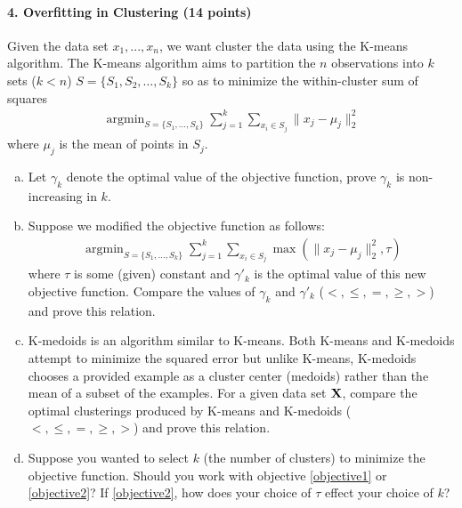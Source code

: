 \documentclass[11pt]{article}
\newcommand{\X}{{\bf X}}
\begin{document}
	\paragraph{4. Overfitting in Clustering (14 points)}
	
	Given the data set $x_1,...,x_n$, we want cluster the data using the K-means algorithm. The K-means algorithm aims to partition the $n$ observations into $k$ sets ($k < n$) $S = \{S_1, S_2, \ldots, S_k\}$ so as to minimize the within-cluster sum of squares
	\begin{eqnarray}
	\mathop{\textrm{argmin}}_{S=\{S_1,...,S_k\}}\sum_{j=1}^k\sum_{x_i\in S_j}\|x_j-\mu_j\|_2^2
	\label{objective1}
	\end{eqnarray}
	where $\mu_j$ is the mean of points in $S_j$.
	
	\begin{enumerate}[(a)]
		\item Let $\gamma_k$ denote the optimal value of the objective function, prove $\gamma_k$ is non-increasing in $k$.
		\item Suppose we modified the objective function as follows:
		\begin{eqnarray}
		\mathop{\textrm{argmin}}_{S=\{S_1,...,S_k\}}\sum_{j=1}^k\sum_{x_i\in S_j}\max(\|x_j-\mu_j\|_2^2, \tau)
		\label{objective2}
		\end{eqnarray}
		where $\tau$ is some (given) constant and $\gamma'_k$ is the optimal value of this new objective function. Compare the values of 
		$\gamma_k$ and $\gamma'_k$ ($<, \le, =, \ge, >$) and prove this relation.
		\item K-medoids is an algorithm similar to K-means. Both K-means and K-medoids attempt to minimize the squared error but unlike K-means, K-medoids chooses a provided example as a cluster center (medoids) rather than the mean of a subset of the examples. For a given data set $\X$, compare the optimal clusterings produced by K-means and K-medoids ($<, \le, =, \ge, >$) and prove this relation.
		\item Suppose you wanted to select $k$ (the number of clusters) to minimize the objective function. Should you work with objective \ref{objective1} or \ref{objective2}? If \ref{objective2}, how does your choice of $\tau$ effect your choice of $k$?
	\end{enumerate}
	
\end{document}
